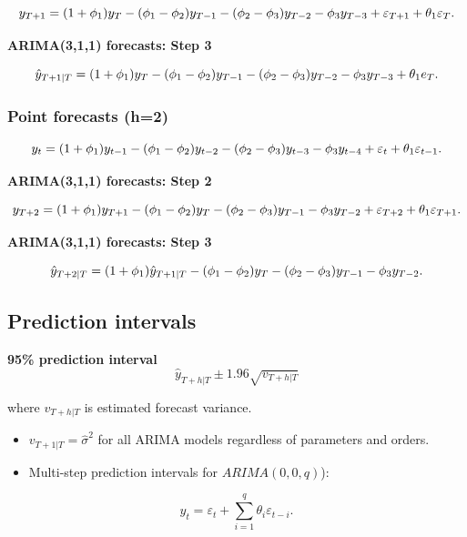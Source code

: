 \documentclass[]{book}
\providecommand{\tightlist}{%
  \setlength{\itemsep}{0pt}\setlength{\parskip}{0pt}}
\begin{document}
\[y_{T+1} = (1+\phi_1)y_{T} -(\phi_1-\phi_2)y_{T-1} - (\phi_2-\phi_3)y_{T-2}\\\mbox{} -\phi_3y_{T-3} + \varepsilon_{T+1}+\theta_1\varepsilon_{T}.\]

\textbf{ARIMA(3,1,1) forecasts: Step 3}

\[\hat{y}_{T+1|T} = (1+\phi_1)y_{T} -(\phi_1-\phi_2)y_{T-1} - (\phi_2-\phi_3)y_{T-2}\\\mbox{} -\phi_3y_{T-3} + \theta_1 e_{T}.\]

\hypertarget{point-forecasts-h2}{%
\subsubsection{Point forecasts (h=2)}\label{point-forecasts-h2}}

\[y_t = (1+\phi_1)y_{t-1} -(\phi_1-\phi_2)y_{t-2} - (\phi_2-\phi_3)y_{t-3}\\\mbox{} -\phi_3y_{t-4} + \varepsilon_t+\theta_1\varepsilon_{t-1}.\]

\textbf{ARIMA(3,1,1) forecasts: Step 2}

\[y_{T+2} = (1+\phi_1)y_{T+1} -(\phi_1-\phi_2)y_{T} - (\phi_2-\phi_3)y_{T-1}\\\mbox{} -\phi_3y_{T-2} + \varepsilon_{T+2}+\theta_1\varepsilon_{T+1}.\]

\textbf{ARIMA(3,1,1) forecasts: Step 3}

\[\hat{y}_{T+2|T} = (1+\phi_1)\hat{y}_{T+1|T} -(\phi_1-\phi_2)y_{T} - (\phi_2-\phi_3)y_{T-1}\\\mbox{} -\phi_3y_{T-2}.\]

\hypertarget{prediction-intervals}{%
\subsection{Prediction intervals}\label{prediction-intervals}}

\textbf{95\% prediction interval}
\[\hat{y}_{T+h|T} \pm 1.96\sqrt{v_{T+h|T}}\]

where \(v_{T+h|T}\) is estimated forecast variance.

\begin{itemize}
\tightlist
\item
  \(v_{T+1|T}=\hat{\sigma}^2\) for all ARIMA models regardless of parameters and orders.
\item
  Multi-step prediction intervals for \(ARIMA(0,0,q)\)):
\end{itemize}

\[y_t = \varepsilon_t + \sum_{i=1}^q \theta_i \varepsilon_{t-i}.\]
\end{document}
